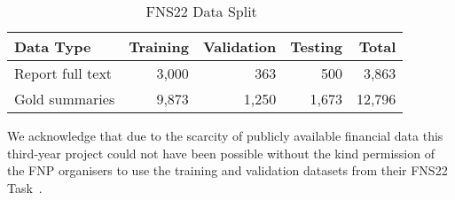\begin{table}[h]
    \centering
    \begin{tabular}{lrrr r}
        \hline
        Data Type & Training & Validation & Testing & Total \\
        \midrule
        Report full text & 3,000 & 363 & 500 & 3,863 \\
        Gold summaries & 9,873 & 1,250 & 1,673 & 12,796 \\
        \bottomrule
    \end{tabular}
    \caption{FNS22 Data Split~\cite{el-haj-etal-2022-financial}}
    \label{tab:fns22-data}
\end{table}

We acknowledge that due to the scarcity of publicly available financial data this third-year project could not have been possible without the kind permission of the FNP organisers to use the training and validation datasets from their FNS22 Task~\cite{fnp-2022-financial}.

